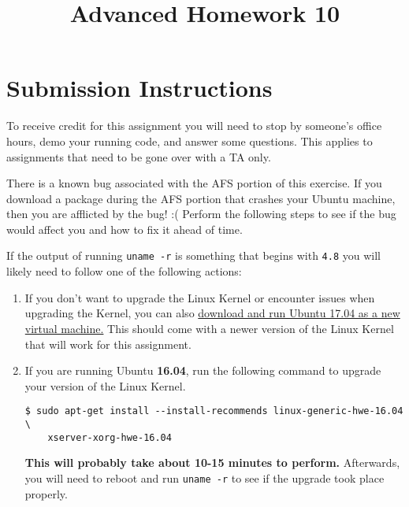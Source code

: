 \documentclass{article}
\begin{document}
\fancyfoot[C]{\color{gray} \thepage~/~\pageref*{LastPage}}
\pagestyle{fancyplain}

\title{\textbf{Advanced Homework 10\\}}
\author{\textbf{\color{red}{Due: Wednesday, November 22nd, 11:59PM (Hard Deadline)}}}
\date{}
\maketitle


\section*{Submission Instructions}
To receive credit for this assignment you will need to stop by someone's
office hours, demo your running code, and answer some questions. \textbf{\color{red}{Make sure
to check the office hour schedule as the real due date is at the last office
hours before the date listed above.}} This applies to assignments that need to be gone over with a TA only.




\medskip

\begin{mdframed}
\textbf{\color{red}{!!! IMPORTANT NOTE !!!}}

There is a known bug associated with the AFS portion of this exercise. If you
download a package during the AFS portion that crashes your Ubuntu machine, then
you are afflicted by the bug! :( Perform the following steps to see if the
bug would affect you and how to fix it ahead of time.

If the output of running \texttt{uname -r} is something that begins with
\texttt{4.8} you will likely need to follow one of the following actions:

\begin{enumerate}

    \item
        If you don't want to upgrade the Linux Kernel or encounter issues when
        upgrading the Kernel, you can also
        \href{https://www.ubuntu.com/download/desktop}{download and run Ubuntu
        17.04 as a new virtual machine.} This should come with a newer version
        of the Linux Kernel that will work for this assignment.

    \item
        If you are running Ubuntu \textbf{16.04}, run the following command to
        upgrade your version of the Linux Kernel.

\begin{lstlisting}
$ sudo apt-get install --install-recommends linux-generic-hwe-16.04 \
    xserver-xorg-hwe-16.04
\end{lstlisting}

        \textbf{This will probably take about 10-15 minutes to perform.}
        Afterwards, you will need to reboot and run \texttt{uname -r} to see if
        the upgrade took place properly.
\end{enumerate}


\end{mdframed}
\end{document}

